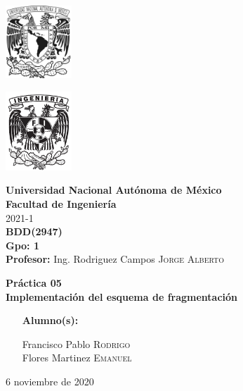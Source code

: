 \documentclass{article}
\newcommand{\materia}{BDD}
\newcommand{\clave}{2947}
\newcommand{\profesor}{Ing. Rodriguez Campos \textsc{Jorge Alberto}}
\newcommand{\semestre}{2021-1}
\newcommand{\alumno}{
    Francisco Pablo \textsc{Rodrigo}  \\ 
    Flores Martinez \textsc{Emanuel}   
}
\newcommand{\actividad}{Práctica 05}
\newcommand{\titulo}{Implementación del esquema de fragmentación}
\newcommand{\fechaEntrega}{6 noviembre de 2020}
\begin{document}
\thispagestyle{empty}
\begin{minipage}[t][5cm][t]{0.2\linewidth}
    \includegraphics[width=2.5cm]{unam.jpg}
    \vspace{10cm}

    \includegraphics[width=2.5cm]{fiblack}
\end{minipage}
\begin{minipage}[t]{0.7\linewidth}
    \vspace{-2.5cm}
    \LARGE{\textbf{Universidad Nacional Autónoma de México}}\\
    \Large{\textbf{Facultad de Ingeniería}} \\

    \large{\semestre}\\[2cm]

    \large{\textbf{\materia (\clave)}}\\
    \large{\textbf{Gpo: 1}}\\[5mm]
    \large{\textbf{Profesor:} \profesor}\\ [1.5cm]
    \begin{center}
        \LARGE{\textbf{\actividad}}\\
        \LARGE{\textbf{\titulo}}\\
    \end{center}

    \vspace{3.3cm}

    \large{
        \begin{itemize}[
            noitemsep,
            align=left,
        ]
            \item [\textbf{Alumno(s):}] 
            \begin{flushright}
                \alumno
            \end{flushright}
        \end{itemize}
    } \vspace{1.5cm}

    \begin{flushright}
        \fechaEntrega%
    \end{flushright}
\end{minipage}
\end{document}
